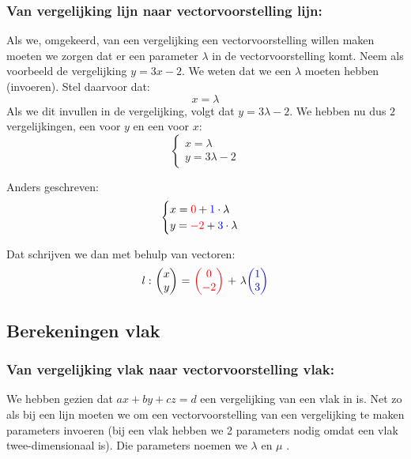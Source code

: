 \subsubsection{Van vergelijking lijn naar vectorvoorstelling lijn:}
Als we, omgekeerd, van een vergelijking een vectorvoorstelling willen maken moeten we zorgen dat er een parameter $ \lambda $ in de vectorvoorstelling komt. Neem als voorbeeld de vergelijking $ y = 3x - 2 $. We weten dat we een $ \lambda $ moeten hebben (invoeren). Stel daarvoor dat:
\[ x =  \lambda \]
Als we dit invullen in de vergelijking, volgt dat $y = 3\lambda - 2$. We hebben nu dus $2$ vergelijkingen, een voor $y$ en een voor $x$:
\[\begin{cases}
x = \lambda \\
y = 3\lambda - 2 
\end{cases}
\] 

Anders geschreven: 
\[\begin{cases}
  x = {\color{red}0}  + {\color{blue}1}\cdot \lambda \\
  y = {\color{red}-2} + {\color{blue}3}\cdot \lambda 
\end{cases}
\] 

Dat schrijven we dan met behulp van vectoren: 
\[l:\ \vectwee{x}{y} \ =\ \vectwee[red]{0}{-2} \ +\ \lambda\vectwee[blue]{1}{3} \]
%

\subsection{Berekeningen vlak}
\subsubsection{Van vergelijking vlak naar vectorvoorstelling vlak:}
We hebben gezien dat $ ax + by + cz = d $ een vergelijking van een vlak in \RD is. Net zo als bij een lijn moeten we om een vectorvoorstelling van een vergelijking te maken parameters invoeren (bij een vlak hebben we 2 parameters nodig omdat een vlak  twee-dimensionaal is). Die parameters noemen we $ \lambda $  en $ \mu $ . 

